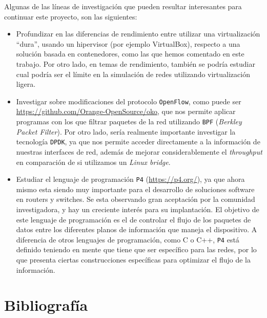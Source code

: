 \documentclass[a4paper, oneside, 12pt]{book}
\begin{document}
	\noindent Algunas de las líneas de investigación que pueden resultar interesantes para continuar este proyecto, son las siguientes:
	\begin{itemize}
		\item Profundizar en las diferencias de rendimiento entre utilizar una virtualización ``dura'', usando un hipervisor (por ejemplo VirtualBox), respecto a una solución basada en contenedores, como las que hemos comentado en este trabajo. Por otro lado, en temas de rendimiento, también se podría estudiar cual podría ser el límite en la simulación de redes utilizando virtualización ligera.
		
		\item Investigar sobre modificaciones del protocolo \texttt{OpenFlow}, como puede ser \url{https://github.com/Orange-OpenSource/oko}, que nos permite aplicar programas con los que filtrar paquetes de la red utilizando \texttt{BPF} (\textit{Berkley Packet Filter}). Por otro lado, sería realmente importante investigar la tecnología \texttt{DPDK}, ya que nos permite acceder directamente a la información de nuestras interfaces de red, además de mejorar considerablemente el \textit{throughput} en comparación de si utilizamos un \textit{Linux bridge}.
		
		\item Estudiar el lenguaje de programación \texttt{P4} (\url{https://p4.org/}), ya que ahora mismo esta siendo muy importante para el desarrollo de soluciones software en routers y switches. Se esta observando gran aceptación por la comunidad investigadora, y hay un creciente interés para su implantación. El objetivo de este lenguaje de programación es el de controlar el flujo de los paquetes de datos entre los diferentes planos de información que maneja el dispositivo. A diferencia de otros lenguajes de programación, como C o C++, \texttt{P4} está definido teniendo en mente que tiene que ser específico para las redes, por lo que presenta ciertas construcciones específicas para optimizar el flujo de la información.
	\end{itemize}

	\pagebreak
	\chapter{Bibliografía}
	
\end{document}
